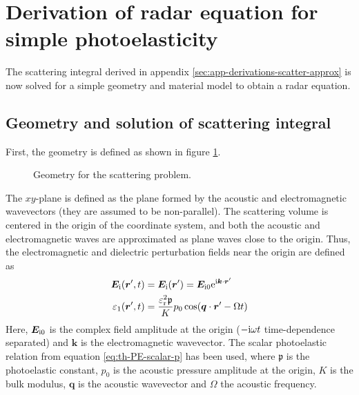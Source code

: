 \documentclass[11pt,twoside]{eitExjobb}
\begin{document}
	\section{Derivation of radar equation for simple photoelasticity \label{sec:app-derivations-radar}}
	The scattering integral derived in appendix \ref{sec:app-derivations-scatter-approx} is now solved for a simple geometry and material model to obtain a radar equation.
	
	\subsection{Geometry and solution of scattering integral \label{sec:app-derivations-radar-sol}}
	First, the geometry is defined as shown in figure \ref{fig:app-radar-geom}.
	\begin{figure}[h]
		\centering
		\resizebox{\textwidth}{!}{
			
		}
		\caption{\label{fig:app-radar-geom} Geometry for the scattering problem.}
	\end{figure}
	The $xy$-plane is defined as the plane formed by the acoustic and electromagnetic wavevectors (they are assumed to be non-parallel). The scattering volume is centered in the origin of the coordinate system, and both the acoustic and electromagnetic waves are approximated as plane waves close to the origin. Thus, the electromagnetic and dielectric perturbation fields near the origin are defined as
	\begin{align}
		\bm{E}_{\mathrm{i}} (\bm{r}',t) &= \bm{E}_{\mathrm{i}} (\bm{r}') = \bm{E}_{\mathrm{i}0} \mathrm{e}^{\mathrm{i} \bm{k}\cdot\bm{r}'} \label{eq:app-radar-planeE} \\
		\varepsilon_1 (\bm{r}',t) &= \frac{\varepsilon_{\mathrm{r}}^2 \mathfrak{p}}{K} p_0 \cos(\bm{q} \cdot \bm{r}' - \Omega t) \label{eq:app-radar-planeEps}
	\end{align}
	Here, $\bm{E}_{\mathrm{i}0}$ is the complex field amplitude at the origin ($-\mathrm{i}\omega t$ time-dependence separated) and $\bm{k}$ is the electromagnetic wavevector. The scalar photoelastic relation from equation \eqref{eq:th-PE-scalar-p} has been used, where $\mathfrak{p}$ is the photoelastic constant, $p_0$ is the acoustic pressure amplitude at the origin, $K$ is the bulk modulus, $\bm{q}$ is the acoustic wavevector and $\Omega$ the acoustic frequency.
	
\end{document}
